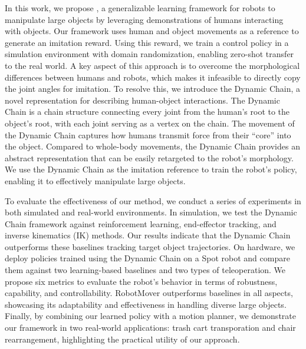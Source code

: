 In this work, we propose \method, a generalizable learning framework for robots to manipulate large objects by leveraging demonstrations of humans interacting with objects. Our framework uses human and object movements as a reference to generate an imitation reward. Using this reward, we train a control policy in a simulation environment with domain randomization, enabling zero-shot transfer to the real world.  A key aspect of this approach is to overcome the morphological differences between humans and robots, which makes it infeasible to directly copy the joint angles for imitation. To resolve this, we introduce the Dynamic Chain, a novel representation for describing human-object interactions. The Dynamic Chain is a chain structure connecting every joint from the human’s root to the object’s root, with each joint serving as a vertex on the chain. The movement of the Dynamic Chain captures how humans transmit force from their ``core'' into the object. Compared to whole-body movements, the Dynamic Chain provides an abstract representation that can be easily retargeted to the robot's morphology. We use the Dynamic Chain as the imitation reference to train the robot's policy, enabling it to effectively manipulate large objects.





To evaluate the effectiveness of our method, we conduct a series of experiments in both simulated and real-world environments. In simulation, we test the Dynamic Chain framework against reinforcement learning, end-effector tracking, and inverse kinematics (IK) methods. Our results indicate that the Dynamic Chain outperforms these baselines tracking target object trajectories. On hardware, we deploy policies trained using the Dynamic Chain on a Spot robot and compare them against two learning-based baselines and two types of teleoperation. We propose six metrics to evaluate the robot's behavior in terms of robustness, capability, and controllability. RobotMover outperforms baselines in all aspects, showcasing its adaptability and effectiveness in handling diverse large objects. Finally, by combining our learned policy with a motion planner, we demonstrate our framework in two real-world applications: trash cart transporation and chair rearrangement, highlighting the practical utility of our approach.

